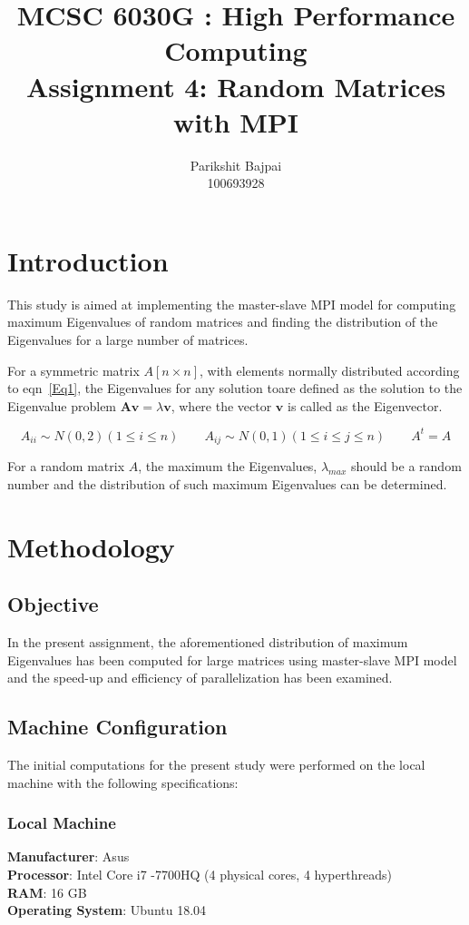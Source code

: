 \documentclass[11pt, oneside]{article}
\title{MCSC 6030G : High Performance Computing \\ Assignment 4: Random Matrices with MPI}
\author{Parikshit Bajpai \\ 100693928}
\date{}							%
\begin{document}
\maketitle

\section{Introduction}
This study is aimed at implementing the master-slave MPI model for computing maximum Eigenvalues of random matrices and finding the distribution of the Eigenvalues for a large number of matrices.

For a symmetric matrix $A [ n \times n]$, with elements normally distributed according to eqn~\ref{Eq1}, the Eigenvalues for any solution toare defined as the solution to the Eigenvalue problem $\mathbf{A}\mathbf{v}=\lambda \mathbf{v}$, where the vector $\mathbf{v}$ is called as the Eigenvector.

\begin{equation} \label{Eq1}
A_{ii} \sim N(0,2)(1\leq i\leq n) \quad\text{}\quad
A_{ij} \sim N(0,1)(1\leq i\leq j\leq n) \quad\text{}\quad
A^{t}=A
\end{equation}

For a random matrix $A$, the maximum the Eigenvalues, $\lambda _{max}$ should be a random number and the distribution of such maximum Eigenvalues can be determined. 

\section{Methodology}
   \subsection{Objective}
In the present assignment, the aforementioned distribution of maximum Eigenvalues has been computed for large matrices using master-slave MPI model and the speed-up and efficiency of parallelization has been examined.


\subsection{Machine Configuration}
The initial computations for the present study were performed on the local machine with the following specifications:
      \subsubsection{Local Machine}
        \textbf{Manufacturer}: Asus\\
	\textbf{Processor}: Intel Core i7 -7700HQ (4 physical cores, 4 hyperthreads)\\
	\textbf{RAM}:  16 GB\\
	\textbf{Operating System}: Ubuntu 18.04\\
\end{document}
